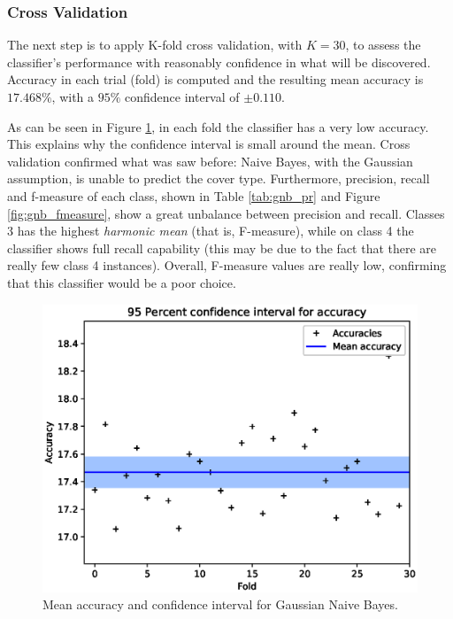 \documentclass[a4paper, 10pt]{article}
\begin{document}
\subsubsection{Cross Validation}
The next step is to apply K-fold cross validation, with $K=30$, to assess the classifier's performance with reasonably confidence in what will be discovered. Accuracy in each trial (fold) is computed and the resulting mean accuracy is $17.468\%$, with a $95\%$ confidence interval of $\pm 0.110$. 

As can be seen in Figure \ref{fig:acc_int_gnb}, in each fold the classifier has a very low accuracy. This explains why the confidence interval is small around the mean. Cross validation confirmed what was saw before: Naive Bayes, with the Gaussian assumption, is unable to predict the cover type. Furthermore, precision, recall and f-measure of each class, shown in Table \ref{tab:gnb_pr} and Figure \ref{fig:gnb_fmeasure}, show a great unbalance between precision and recall. Classes 3 has the highest \emph{harmonic mean} (that is, F-measure), while on class 4 the classifier shows full recall capability (this may be due to the fact that there are really few class 4 instances). Overall, F-measure values are really low, confirming that this classifier would be a poor choice.

\begin{figure}[H]
 \centering
 \includegraphics[width=0.8\linewidth]{pictures/nb_gaussian_accuracy_interval.eps}
 \caption{Mean accuracy and confidence interval for Gaussian Naive Bayes.}
 \label{fig:acc_int_gnb}
\end{figure}
\end{document}
